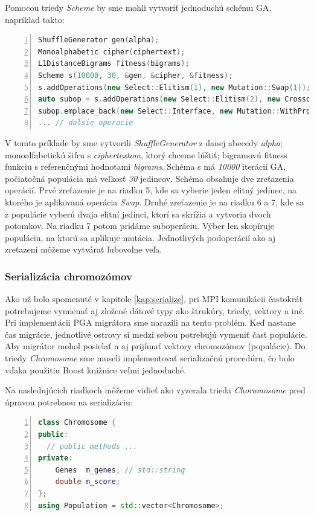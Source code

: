 Pomocou triedy \textit{Scheme} by sme mohli vytvoriť jednoduchú schému GA, napríklad takto:
\begin{lstlisting}[language={c++}, numbers={left}]
ShuffleGenerator gen(alpha);
Monoalphabetic cipher(ciphertext);
L1DistanceBigrams fitness(bigrams);
Scheme s(10000, 30, &gen, &cipher, &fitness);
s.addOperations(new Select::Elitism(1), new Mutation::Swap(1));
auto subop = s.addOperations(new Select::Elitism(2), new Crossover::SinglePoint(2));
subop.emplace_back(new Select::Interface, new Mutation::WithProbability(0.25));
... // dalsie operacie
\end{lstlisting}
V tomto príklade by sme vytvorili \textit{ShuffleGenerator} z danej abecedy \textit{alpha}; monoalfabetickú šifru s \textit{ciphertextom}, ktorý chceme lúštiť; bigramovú fitness funkciu s referenčnými hodnotami \textit{bigrams}. Schéma s má \textit{10000} iterácií GA, počiatočná populácia má veľkosť \textit{30} jedincov. Schéma obsahuje dve zreťazenia operácií. Prvé zreťazenie je na riadku 5, kde sa vyberie jeden elitný jedinec, na ktorého je aplikovaná operácia \textit{Swap}. Druhé zreťazenie je na riadku 6 a 7, kde sa z populácie vyberú dvaja elitní jedinci, ktorí sa skrížia a vytvoria dvoch potomkov. Na riadku 7 potom pridáme suboperáciu. Výber len skopíruje populáciu, na ktorú sa aplikuje mutácia.
Jednotlivých podoperácií ako aj zreťazení môžeme vytvárať ľubovolne veľa.

\subsubsection{Serializácia chromozómov}
Ako už bolo spomenuté v kapitole \ref{kap:serialize}, pri MPI komunikácii častokrát potrebujeme vymienať aj zložené dátové typy ako štrukúry, triedy, vektory a iné.
Pri implementácii PGA migrátora sme narazili na tento problém. Keď nastane čas migrácie, jednotlivé ostrovy si medzi sebou potrebujú vymeniť časť populácie.
Aby migrátor mohol posielať a aj prijímať vektory chromozómov (populácie). Do triedy \textit{Chromosome} sme museli implementovať serializačnú procedúru, čo bolo vďaka použitiu Boost knižnice veľmi jednoduché.

Na nasledujúcich riadkoch môžeme vidieť ako vyzerala trieda \textit{Choromosome} pred úpravou potrebnou na serializáciu:
\begin{lstlisting}[language={c++}, numbers={left}]
class Chromosome {
public:
  // public methods ...
private:
    Genes  m_genes; // std::string
    double m_score;
};
using Population = std::vector<Chromosome>;
\end{lstlisting}

